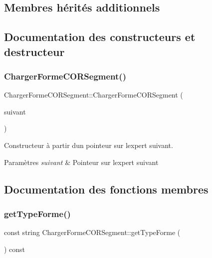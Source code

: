 \subsection*{Membres hérités additionnels}


\subsection{Documentation des constructeurs et destructeur}
\mbox{\label{class_charger_forme_c_o_r_segment_ac3a9caaf7fc8e03678cca2161513a1f4}} 
\subsubsection{\texorpdfstring{ChargerFormeCORSegment()}{ChargerFormeCORSegment()}}
{\footnotesize\ttfamily Charger\+Forme\+C\+O\+R\+Segment\+::\+Charger\+Forme\+C\+O\+R\+Segment (\begin{DoxyParamCaption}\item[{\mbox{\hyperlink{class_charger_forme_c_o_r}{Charger\+Forme\+C\+OR}} $\ast$}]{suivant }\end{DoxyParamCaption})}



Constructeur à partir d\textquotesingle{}un pointeur sur l\textquotesingle{}expert suivant. 


\begin{DoxyParams}{Paramètres}
{\em suivant} & Pointeur sur l\textquotesingle{}expert suivant \\
\hline
\end{DoxyParams}


\subsection{Documentation des fonctions membres}
\mbox{\label{class_charger_forme_c_o_r_segment_a88fc3dc3d1e4fb196246f5105965e285}} 
\subsubsection{\texorpdfstring{getTypeForme()}{getTypeForme()}}
{\footnotesize\ttfamily const string Charger\+Forme\+C\+O\+R\+Segment\+::get\+Type\+Forme (\begin{DoxyParamCaption}{ }\end{DoxyParamCaption}) const\hspace{0.3cm}{\ttfamily [virtual]}}



